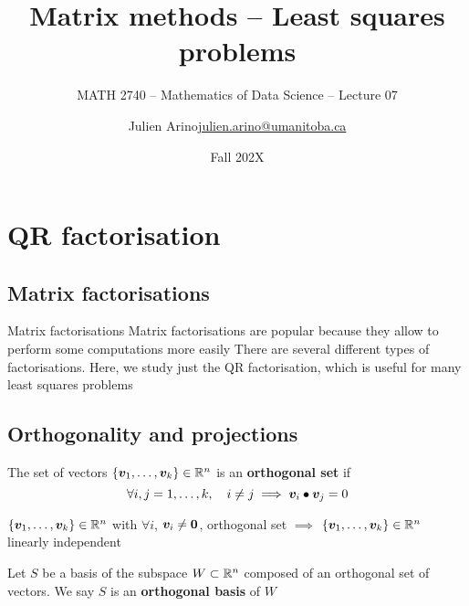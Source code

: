 \documentclass[aspectratio=169]{beamer}\usepackage[]{graphicx}\usepackage[]{xcolor}
\subtitle{MATH 2740 -- Mathematics of Data Science -- Lecture 07}
\author{\texorpdfstring{Julien Arino\newline\url{julien.arino@umanitoba.ca}}{Julien Arino}}
\institute{Department of Mathematics @ University of Manitoba}
\date{Fall 202X}
\title{Matrix methods -- Least squares problems}
\begin{document}


\section{QR factorisation}



\subsection{Matrix factorisations}
\begin{frame}{Matrix factorisations}
	Matrix factorisations are popular because they allow to perform some computations more easily
	\vfill
	There are several different types of factorisations. Here, we study just the QR factorisation, which is useful for many least squares problems
\end{frame}	
	

\subsection{Orthogonality and projections}

\begin{frame}
\begin{definition}
The set of vectors $\{\bm{v}_1,\ldots,\bm{v}_k\}\in\mathbb{R}^n$ is an \textbf{orthogonal set} if
\[
\forall i,j=1,\ldots,k,\quad i\neq j \implies \bm{v}_i\bullet\bm{v}_j=0
\]
\end{definition}

\begin{theorem}\label{th:ortho_implies_LI}
$\{\bm{v}_1,\ldots,\bm{v}_k\}\in\mathbb{R}^n$ with $\forall i$, $\bv_i\neq\b0$, orthogonal set $\implies$ $\{\bm{v}_1,\ldots,\bm{v}_k\}\in\mathbb{R}^n$ linearly independent
\end{theorem}

\begin{definition}
Let $S$ be a basis of the subspace $W\subset\mathbb{R}^n$ composed of an orthogonal set of vectors. We say $S$ is an \textbf{orthogonal basis} of $W$
\end{definition}
\end{frame}
\end{document}
